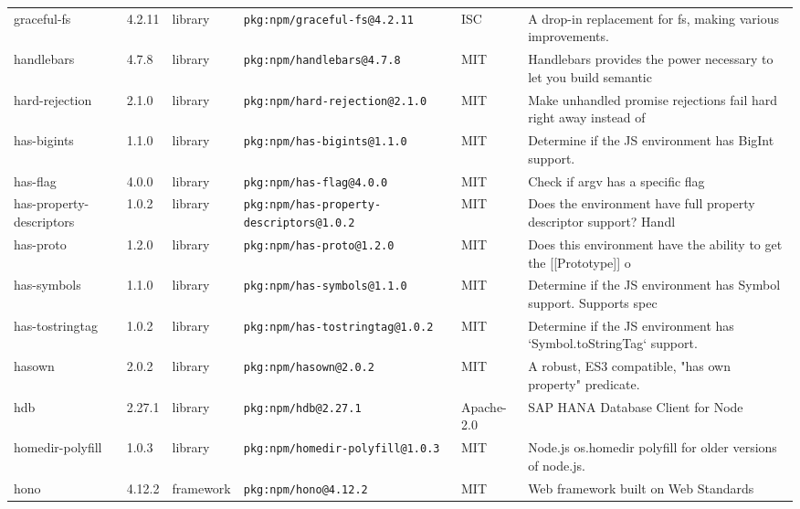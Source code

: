 \documentclass[11pt,a4paper]{article}
\begin{document}
\begin{longtable}{|p{4cm}|p{2cm}|p{1.6cm}|p{5cm}|p{1.5cm}|p{3.5cm}|}
\raggedright graceful-fs & 4.2.11 & library & \small\texttt{pkg:npm/graceful-fs@4.2.11} & ISC & \small A drop-in replacement for fs, making various improvements. \\
\raggedright handlebars & 4.7.8 & library & \small\texttt{pkg:npm/handlebars@4.7.8} & MIT & \small Handlebars provides the power necessary to let you build semantic \\
\raggedright hard-rejection & 2.1.0 & library & \small\texttt{pkg:npm/hard-rejection@2.1.0} & MIT & \small Make unhandled promise rejections fail hard right away instead of \\
\raggedright has-bigints & 1.1.0 & library & \small\texttt{pkg:npm/has-bigints@1.1.0} & MIT & \small Determine if the JS environment has BigInt support. \\
\raggedright has-flag & 4.0.0 & library & \small\texttt{pkg:npm/has-flag@4.0.0} & MIT & \small Check if argv has a specific flag \\
\raggedright has-property-descriptors & 1.0.2 & library & \small\texttt{pkg:npm/has-property-descriptors@1.0.2} & MIT & \small Does the environment have full property descriptor support? Handl \\
\raggedright has-proto & 1.2.0 & library & \small\texttt{pkg:npm/has-proto@1.2.0} & MIT & \small Does this environment have the ability to get the [[Prototype]] o \\
\raggedright has-symbols & 1.1.0 & library & \small\texttt{pkg:npm/has-symbols@1.1.0} & MIT & \small Determine if the JS environment has Symbol support. Supports spec \\
\raggedright has-tostringtag & 1.0.2 & library & \small\texttt{pkg:npm/has-tostringtag@1.0.2} & MIT & \small Determine if the JS environment has `Symbol.toStringTag` support. \\
\raggedright hasown & 2.0.2 & library & \small\texttt{pkg:npm/hasown@2.0.2} & MIT & \small A robust, ES3 compatible, "has own property" predicate. \\
\raggedright hdb & 2.27.1 & library & \small\texttt{pkg:npm/hdb@2.27.1} & Apache-2.0 & \small SAP HANA Database Client for Node \\
\raggedright homedir-polyfill & 1.0.3 & library & \small\texttt{pkg:npm/homedir-polyfill@1.0.3} & MIT & \small Node.js os.homedir polyfill for older versions of node.js. \\
\raggedright hono & 4.12.2 & framework & \small\texttt{pkg:npm/hono@4.12.2} & MIT & \small Web framework built on Web Standards \\

\end{longtable}
\end{document}

